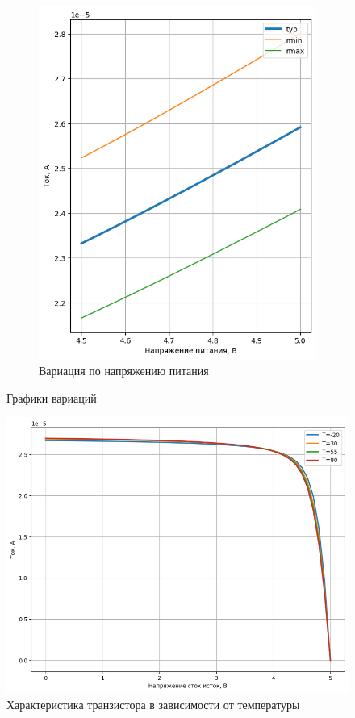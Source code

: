 \documentclass[a4paper,12pt]{article} %
\begin{document}
\begin{figure}[H]
\begin{subfigure}[b]{0.5\textwidth}
      \includegraphics[width=\textwidth]{current_vdd_thin.png}
      \caption{ Вариация по напряжению питания }
      \label{pic:current_vdd_thin}
    \end{subfigure}
    \caption{Графики вариаций}
  \end{figure}


  \begin{figure}[H]
    \includegraphics[width=\textwidth]{temp_vds.png}
    \caption{Характеристика транзистора в зависимости от температуры}
    \label{pic:new}
\end{figure}
\end{document}
